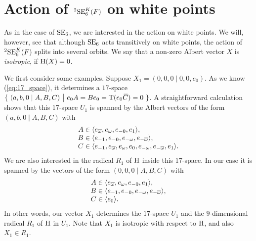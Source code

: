 \section{Action of ${}^2\mathrm{SE}_6^K(F)$ on white points}

As in the case of $\mathrm{SE}_6$, we are interested in the action on white points. We will, however, see 
that although $\mathrm{SE}_6$ acts transitively on white points, the action of ${}^2\mathrm{SE}_6^K(F)$ splits
into several orbits. We say that a non-zero Albert vector $X$ is \textit{isotropic}, if
\mbox{$\mathrm{H}(X) = 0$}. 

We first consider some examples. Suppose $X_1 = (0,0,0\mid 0,0,e_0)$. As we know (\ref{eq:17_space}), 
it determines 
a $17$-space $	\{\ (a,b,0 \mid A,B,C)\ \big|\ e_0 A = B e_0 = \operatorname{T}(e_0 \mathord{\mbox{\hspace*{0pt}}\,\overline{\!C\!\!\;}\!\:}\mbox{\hspace*{0pt}}) = 0\ \}$. A
straightforward calculation shows that
this $17$-space $U_1$ is spanned by the Albert vectors of the form \mbox{$(a,b,0\mid A,B,C)$} with
\begin{equation}
	\begin{array}{r@{\;}c@{\;}l}
		A & \in & \langle e_{\bar{\omega}}, e_{\omega}, e_{-0}, e_1 \rangle, \\
		B & \in & \langle e_{-1}, e_{-0}, e_{-\omega}, e_{-\bar{\omega}} \rangle, \\
		C & \in & \langle e_{-1}, e_{\bar{\omega}}, e_{\omega}, e_0, e_{-\omega}, e_{-\bar{\omega}}, e_1
		\rangle.
	\end{array}
\end{equation}
We are also interested in the radical $R_1$ of $\mathrm{H}$ inside this $17$-space. In our case it is spanned
by the vectors of the form \mbox{$(0,0,0\mid A,B,C)$} with
\begin{equation}
	\begin{array}{r@{\;}c@{\;}l}
		A & \in & \langle e_{\bar{\omega}}, e_{\omega}, e_{-0}, e_1 \rangle, \\
		B & \in & \langle e_{-1}, e_{-0}, e_{-\omega}, e_{-\bar{\omega}} \rangle, \\
		C & \in & \langle e_0 \rangle.
	\end{array}
\end{equation}
In other words, our vector $X_1$ determines the $17$-space $U_1$ and the $9$-dimensional radical $R_1$ 
of $\mathrm{H}$ in $U_1$. Note that $X_1$ is isotropic with respect to $\mathrm{H}$, and also $X_1 \in R_1$. 

